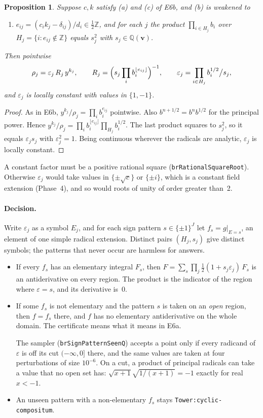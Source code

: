 \documentclass[11pt]{article}
\newtheorem{proposition}[theorem]{Proposition}
\theoremstyle{definition}
\theoremstyle{remark}
\newcommand{\Q}{\mathbb{Q}}
\newcommand{\Z}{\mathbb{Z}}
\newcommand{\code}[1]{\texttt{#1}}
\begin{document}
\begin{proposition}
Suppose $c,k$ satisfy (a) and (c) of E6b, and (b) is weakened to
\begin{enumerate}
\item[(b$'$)] $e_{ij}=(c_ik_j-\delta_{ij})/d_i\in\tfrac12\Z$, and for each $j$
  the product $\prod_{i\in H_j}b_i$ over $H_j=\{i:e_{ij}\notin\Z\}$ equals
  $s_j^2$ with $s_j\in\Q(\mathbf v)$.
\end{enumerate}
Then pointwise
\[ \rho_j=\varepsilon_j\,R_j\,y^{k_j},\qquad
   R_j=\Bigl(s_j\prod_ib_i^{\lfloor e_{ij}\rfloor}\Bigr)^{-1},\qquad
   \varepsilon_j=\prod_{i\in H_j}b_i^{1/2}\big/s_j, \]
and $\varepsilon_j$ is locally constant with values in $\{1,-1\}$.
\end{proposition}

\begin{proof}
As in E6b, $y^{k_j}/\rho_j=\prod_ib_i^{e_{ij}}$ pointwise. Also
$b^{n+1/2}=b^n b^{1/2}$ for the principal power. Hence
$y^{k_j}/\rho_j=\prod_ib_i^{\lfloor e_{ij}\rfloor}\prod_{H_j}b_i^{1/2}$. The
last product squares to $s_j^2$, so it equals $\varepsilon_js_j$ with
$\varepsilon_j^2=1$. Being continuous wherever the radicals are analytic,
$\varepsilon_j$ is locally constant.
\end{proof}

A constant factor must be a positive rational square
(\code{brRationalSquareRoot}). Otherwise $\varepsilon_j$ would take values in
$\{\pm\sqrt c\}$ or $\{\pm i\}$, which is a constant field extension (Phase~4),
and so would roots of unity of order greater than~2.

\paragraph{Decision.} Write $\varepsilon_j$ as a symbol $E_j$, and for each sign
pattern $s\in\{\pm1\}^J$ let $f_s=g|_{E=s}$, an element of one simple radical
extension. Distinct pairs $(H_j,s_j)$ give distinct symbols; the patterns that
never occur are harmless for answers.
\begin{itemize}
\item If every $f_s$ has an elementary integral $F_s$, then
  $F=\sum_s\prod_j\tfrac12(1+s_j\varepsilon_j)\,F_s$ is an antiderivative on
  every region. The product is the indicator of the region where $\varepsilon=s$,
  and its derivative is~0.
\item If some $f_s$ is not elementary and the pattern $s$ is taken on an
  \emph{open} region, then $f=f_s$ there, and $f$ has no elementary
  antiderivative on the whole domain. The certificate means what it means in
  E6a.

  The sampler (\code{brSignPatternSeenQ}) accepts a point only if every
  radicand of $\varepsilon$ is off its cut $(-\infty,0]$ there, and the same
  values are taken at four perturbations of size $10^{-6}$. On a cut, a product
  of principal radicals can take a value that no open set has:
  $\sqrt{x+1}\sqrt{1/(x+1)}=-1$ exactly for real $x<-1$.
\item An unseen pattern with a non-elementary $f_s$ stays
  \code{Tower:cyclic-compositum}.
\end{itemize}
\end{document}
